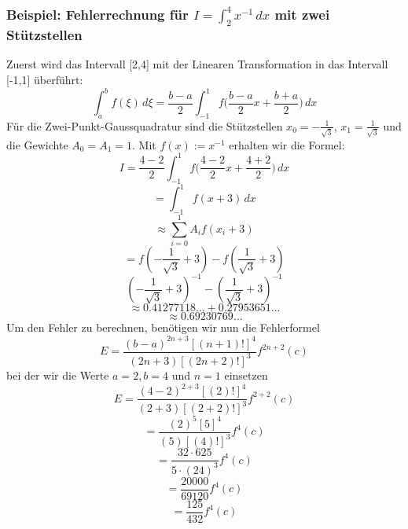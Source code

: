\subsubsection{Beispiel: Fehlerrechnung für $I = \int_{2}^{4}x^{-1}\,dx$ mit zwei Stützstellen}
Zuerst wird das Intervall [2,4] mit der Linearen Transformation in das Intervall [-1,1] überführt:
\begin{equation}
    \int_{a}^{b} f(\xi)\,d\xi = \frac{b-a}{2}\int_{-1}^{1} f \bigg( \frac{b-a}{2} x + \frac{b+a}{2} \bigg) \,dx
\end{equation}
\noindent
Für die Zwei-Punkt-Gaussquadratur sind die Stützstellen 
$x_{0}= -\frac{1}{\sqrt{3}}$, $x_{1} = \frac{1}{\sqrt{3}}$ 
und die Gewichte $A_{0} = A_{1} = 1$. Mit $f(x) := x^{-1}$ 
erhalten wir die Formel:
\begin{equation*}
    I = \frac{4-2}{2} \int_{-1}^{1} f \bigg( \frac{4-2}{2} x + \frac{4+2}{2} \bigg) \,dx
\end{equation*}
\begin{equation*}
    = \int_{-1}^{1} f (x + 3)\,dx 
\end{equation*}
\begin{equation*}
    \approx \sum_{i=0}^{1} A_{i} f(x_{i} + 3)
\end{equation*}
\begin{equation*}
    = f(-\frac{1}{\sqrt{3}}+3)-f(\frac{1}{\sqrt{3}}+3)
\end{equation*}
\begin{equation}
    (-\frac{1}{\sqrt{3}}+3)^{-1} - (\frac{1}{\sqrt{3}}+3)^{-1}
\end{equation}
\begin{equation*}
    \approx 0.41277118\dots + 0.27953651\dots
\end{equation*}
\begin{equation}
    \approx 0.69230769\dots
\end{equation}
\noindent
Um den Fehler zu berechnen, benötigen wir nun die Fehlerformel
\begin{equation}
    E = \frac{(b-a)^{2n+3}[(n+1)!]^{4}}{(2n+3)[(2n+2)!]^{3}}f^{2n+2}(c)
\end{equation}
\noindent
bei der wir die Werte $a = 2, b = 4$ und $n = 1$ einsetzen
\begin{equation*}
    E = \frac{(4-2)^{2+3}[(2)!]^{4}}{(2+3)[(2+2)!]^{3}}f^{2+2}(c)
\end{equation*}
\begin{equation*}
    = \frac{(2)^{5}[5]^{4}}{(5)[(4)!]^{3}}f^{4}(c)
\end{equation*}
\begin{equation*}
    = \frac{32 \cdot 625}{5 \cdot (24)^{3}}f^{4}(c)
\end{equation*}
\begin{equation*}
    = \frac{20000}{69120}f^{4}(c)
\end{equation*}
\begin{equation}
    = \frac{125}{432}f^{4}(c)
\end{equation}
\newpage

